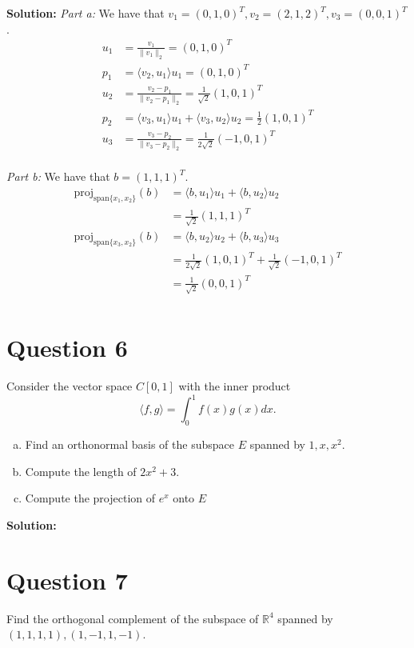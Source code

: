 \documentclass{article}
\begin{document}
\vspace{0.25cm}\noindent\textbf{Solution:}
\noindent\textit{Part a:}
We have that $ v_1 = (0, 1, 0)^T, v_2 = (2, 1, 2)^T, v_3 = (0, 0, 1)^T $.
\begin{align*}
    u_1 &= \frac{v_1}{\|v_1\|_2} = (0, 1, 0)^T \\
    p_1 &= \langle v_2, u_1 \rangle u_1 = (0, 1, 0)^T \\
    u_2 &= \frac{v_2 - p_1}{\|v_2 - p_1\|_2} = \frac{1}{\sqrt{2}} (1, 0, 1)^T \\
    p_2 &= \langle v_3, u_1 \rangle u_1 + \langle v_3, u_2 \rangle u_2 = \frac{1}{2} (1, 0, 1)^T \\
    u_3 &= \frac{v_3 - p_2}{\|v_3 - p_2\|_2} = \frac{1}{2 \sqrt{2}} (-1, 0, 1)^T \\
\end{align*}

\noindent\textit{Part b:}
We have that $ b = (1, 1, 1)^T $.
\begin{align*}
    \text{proj}_{\text{span}\{x_1, x_2\}}(b) &= \langle b, u_1 \rangle u_1 + \langle b, u_2 \rangle u_2 \\
    &= \frac{1}{\sqrt{2}} (1, 1, 1)^T \\
    \text{proj}_{\text{span}\{x_3, x_2\}}(b) &= \langle b, u_2 \rangle u_2 + \langle b, u_3 \rangle u_3 \\
    &= \frac{1}{2 \sqrt{2}} (1, 0, 1)^T + \frac{1}{\sqrt{2}} (-1, 0, 1)^T \\
    &= \frac{1}{\sqrt{2}} (0, 0, 1)^T \\
\end{align*}

\section*{Question 6}
Consider the vector space $C[0,1]$ with the inner product
$$ \langle f, g \rangle = \int_{0}^{1} f(x)g(x)dx. $$
\begin{enumerate}[a.]
    \item Find an orthonormal basis of the subspace $E$ spanned by $1, x, x^2$.
    \item Compute the length of $2x^2 + 3$.
    \item Compute the projection of $e^x$ onto $E$
\end{enumerate}

\vspace{0.25cm}\noindent\textbf{Solution:}

\section*{Question 7}
Find the orthogonal complement of the subspace of $\mathbb{R}^4$ spanned by $(1, 1, 1, 1), (1, -1, 1, -1)$.
\end{document}
